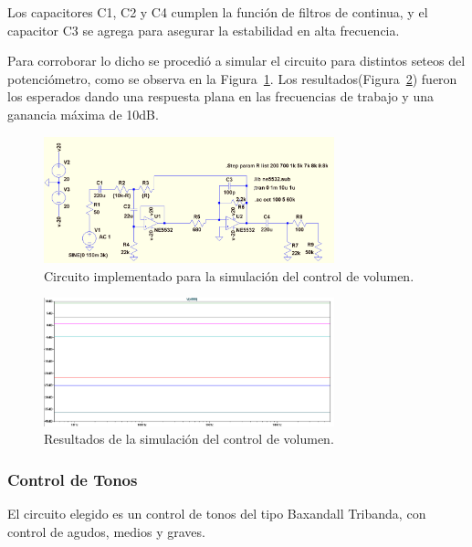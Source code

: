 Los capacitores C1, C2 y C4 cumplen la función de filtros de continua, y el capacitor C3 se agrega para asegurar la estabilidad en alta frecuencia.

Para corroborar lo dicho se procedió a simular el circuito para distintos seteos del potenciómetro, como se observa en la Figura~\ref{ctrl_vol_cir_sim}. Los resultados(Figura~\ref{ctrl_vol_sim}) fueron los esperados dando una respuesta plana en las frecuencias de trabajo y una ganancia máxima de 10dB.

\begin{figure}[H]
\centering
\includegraphics[width=0.75\textwidth]{img/ctrl_vol_cir_sim.png}
\caption{Circuito implementado para la simulación del control de volumen.}
\label{ctrl_vol_cir_sim} 
\end{figure}

\begin{figure}[H]
\centering
\includegraphics[width=0.75\textwidth]{img/cir_vol_sim.png}
\caption{Resultados de la simulación del control de volumen.}
\label{ctrl_vol_sim} 
\end{figure}

\subsubsection{Control de Tonos}

El circuito elegido es un control de tonos del tipo Baxandall Tribanda,  con control de agudos, medios y graves. 

